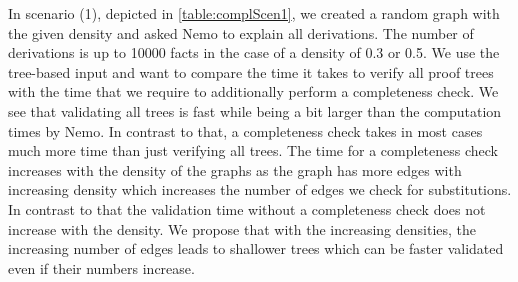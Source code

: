 \begin{table}
    \centering
    \caption{Comparision between tree validation and a completeness check in scenario 1}       
    \label{table:complScen1}
\end{table}

In scenario (1), depicted in \cref{table:complScen1}, we created a random graph with the given density and asked Nemo to explain all derivations. The number of derivations is up to 10000 facts in the case of a density of 0.3 or 0.5. We use the tree-based input and want to compare the time it takes to verify all proof trees with the time that we require to additionally perform a completeness check. We see that validating all trees is fast while being a bit larger than the computation times by Nemo. In contrast to that, a completeness check takes in most cases much more time than just verifying all trees. The time for a completeness check increases with the density of the graphs as the graph has more edges with increasing density which increases the number of edges we check for substitutions. In contrast to that the validation time without a completeness check does not increase with the density. We propose that with the increasing densities, the increasing number of edges leads to shallower trees which can be faster validated even if their numbers increase.

